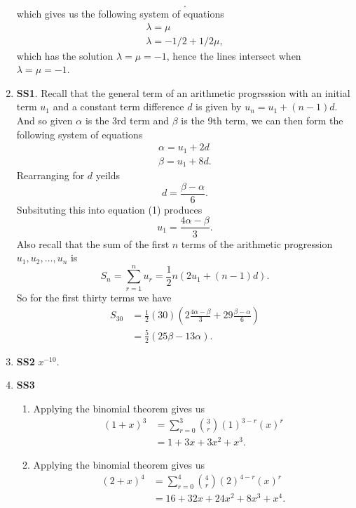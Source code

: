 \documentclass[12pt,oneside]{book}
\begin{document}
\begin{enumerate}
\[        .\] which gives us the following system of equations \begin{align*}
            \lambda = \mu \\
            \lambda = -1/2 + 1/2 \mu,
        \end{align*}
        which has the solution $\lambda = \mu = -1$, hence the lines intersect when $\lambda = \mu = -1$.
        \item \textbf{SS1}. Recall that the general term of an arithmetic progrsssion with an initial term $u_1$ and a constant term difference $d$ is given by $u_n = u_1 + (n-1)d$. And so given $\alpha$ is the 3rd term and $\beta$ is the 9th term, we can then form the following system of equations \begin{align*}
            \alpha = u_1 + 2d \\
            \beta = u_1 + 8d.
        \end{align*}
        Rearranging for $d$ yeilds \[
            d = \frac{\beta - \alpha}{6}
        .\] Subsituting this into equation (1) produces \[
            u_1 = \frac{4 \alpha - \beta}{3}
        .\] Also recall that the sum of the first $n$ terms of the arithmetic progression $u_1, u_2, \ldots, u_n$ is \[
            S_n = \sum_{r=1}^{n} u_r = \frac{1}{2} n (2u_1 + (n-1)d)  
        .\] So for the first thirty terms we have \begin{align*}
            S_{30} &= \frac{1}{2} (30) \left( 2 \frac{4 \alpha - \beta}{3} + 29 \frac{\beta - \alpha}{6} \right) \\
            &= \frac{5}{2} \left( 25 \beta -13 \alpha \right).
        \end{align*} 
        \item \textbf{SS2} $x^{-10}$.
        \item \textbf{SS3} \begin{enumerate}
            \item Applying the binomial theorem gives us \begin{align*}
                (1 + x)^3 &= \sum_{r = 0}^{3} {3 \choose r} (1)^{3 - r} (x)^{r} \\
                &= 1 + 3x + 3x^2 + x^3.
            \end{align*}
            \item Applying the binomial theorem gives us \begin{align*}
                (2 + x)^4 &= \sum_{r = 0}^{4} {4 \choose r} (2)^{4 - r} (x)^{r} \\
                &= 16 + 32 x + 24 x^2 + 8 x^3 + x^4.

\end{align*}
\end{enumerate}
\end{enumerate}
\end{document}
